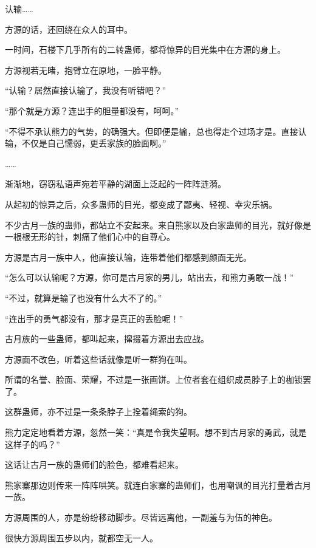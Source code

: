 
\begin{this_body}



认输……

方源的话，还回绕在众人的耳中。

一时间，石楼下几乎所有的二转蛊师，都将惊异的目光集中在方源的身上。

方源视若无睹，抱臂立在原地，一脸平静。

“认输？居然直接认输了，我没有听错吧？”

“那个就是方源？连出手的胆量都没有，呵呵。”

“不得不承认熊力的气势，的确强大。但即便是输，总也得走个过场才是。直接认输，不仅是自己懦弱，更丢家族的脸面啊。”

……

渐渐地，窃窃私语声宛若平静的湖面上泛起的一阵阵涟漪。

从起初的惊异之后，众多蛊师的目光，都变成了鄙夷、轻视、幸灾乐祸。

不少古月一族的蛊师，都站立不安起来。来自熊家以及白家蛊师的目光，就好像是一根根无形的针，刺痛了他们心中的自尊心。

方源是古月一族中人，他直接认输，连带着他们都感到颜面无光。

“怎么可以认输呢？方源，你可是古月家的男儿，站出去，和熊力勇敢一战！”

“不过，就算是输了也没有什么大不了的。”

“连出手的勇气都没有，那才是真正的丢脸呢！”

古月族的一些蛊师，都叫起来，撺掇着方源出去应战。

方源面不改色，听着这些话就像是听一群狗在叫。

所谓的名誉、脸面、荣耀，不过是一张画饼。上位者套在组织成员脖子上的枷锁罢了。

这群蛊师，亦不过是一条条脖子上拴着绳索的狗。

熊力定定地看着方源，忽然一笑：“真是令我失望啊。想不到古月家的勇武，就是这样子的吗？”

这话让古月一族的蛊师们的脸色，都难看起来。

熊家寨那边则传来一阵阵哄笑。就连白家寨的蛊师们，也用嘲讽的目光打量着古月一族。

方源周围的人，亦是纷纷移动脚步。尽皆远离他，一副羞与为伍的神色。

很快方源周围五步以内，就都空无一人。


\end{this_body}
